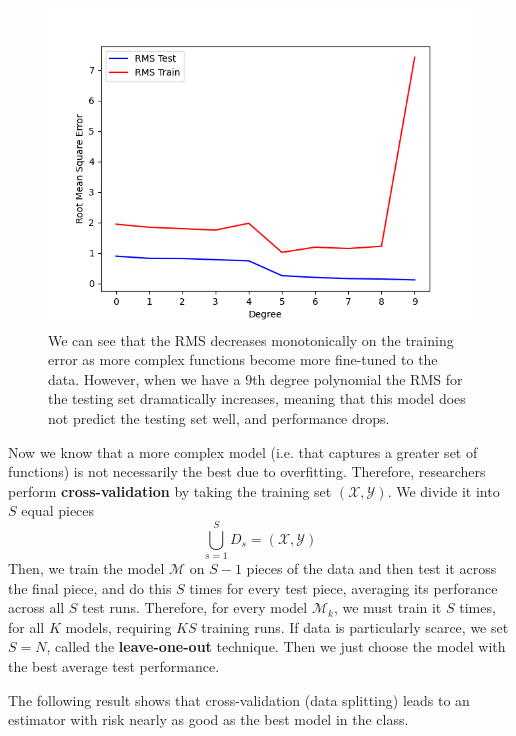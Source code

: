 \documentclass{article}
\begin{document}
    \begin{figure}[H]
      \centering
      \includegraphics[scale=0.4]{img/Degree_vs_RMS.png}
      \caption{We can see that the RMS decreases monotonically on the training error as more complex functions become more fine-tuned to the data. However, when we have a $9$th degree polynomial the RMS for the testing set dramatically increases, meaning that this model does not predict the testing set well, and performance drops. }
      \label{fig:poly_deg_vs_rms}
    \end{figure}

    Now we know that a more complex model (i.e. that captures a greater set of functions) is not necessarily the best due to overfitting. Therefore, researchers perform \textbf{cross-validation} by taking the training set $(\mathcal{X}, \mathcal{Y})$. We divide it into $S$ equal pieces 
    \begin{equation}
      \bigcup_{s=1}^S D_s = (\mathcal{X}, \mathcal{Y})
    \end{equation}
    Then, we train the model $\mathcal{M}$ on $S-1$ pieces of the data and then test it across the final piece, and do this $S$ times for every test piece, averaging its perforance across all $S$ test runs. Therefore, for every model $\mathcal{M}_k$, we must train it $S$ times, for all $K$ models, requiring $KS$ training runs. If data is particularly scarce, we set $S = N$, called the \textbf{leave-one-out} technique. Then we just choose the model with the best average test performance. 

    The following result shows that cross-validation (data splitting) leads to an estimator with risk nearly as good as the best model in the class. 
\end{document}
